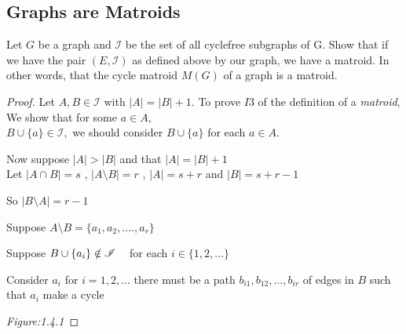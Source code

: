 \documentclass[../main.tex]{subfiles}
\begin{document}
\subsection{Graphs are Matroids} 
\begin{thm}
\noindent Let $G$ be a graph and $\mathcal{I}$ be the set of all cyclefree subgraphs of G.
Show that if we have the pair $(E,\mathcal{I})$ as defined above by our graph, we have a matroid. In other words, that the cycle matroid $M(G)$ of a graph is a matroid.
\end{thm} 
\begin{proof}
 Let $A,B \in \mathcal{I}$ with $|A|=|B|+1.$
 \noindent To prove $ I3 $ of the definition of a \textit{matroid}, We show that for some $a \in A ,$\\$ B \cup \{a\} \in \mathcal{I},$  we should consider $B \cup \{a\}$ for each $a \in A.$ 
 
 \noindent Now suppose $ |A|  >  |B| $ and that $|A|  =  |B| + 1$\\
 Let 
 $ |A \cap B| = s $ , $ |A \setminus B| = r$ ,
 $ |A| = s + r $ and $ |B| = s + r - 1$ 
 
\noindent So $ |B \setminus A| = r - 1$
 
 \noindent Suppose $ A \setminus B = \{ a_1, a_2, .... , a_r \} $ 
 
 \noindent Suppose $ B \cup \{ a_i \} \notin \mathcal{I} \hspace{3mm} $ for each $ i \in \{ 1,2,... \}$
 
 \noindent Consider $ a_i $ for $ i = 1, 2,... $ there must be a path $ b_{i1}, b_{12}, ... , b_{ir} $ of edges in $B$ such that $ a_i $ make a cycle
  
 \begin{minipage}{.2\textwidth}
\textit{Figure:1.4.1}
 \end{minipage}
\hspace{4cm} \begin{minipage}{.2\textwidth}
\end{minipage}
\end{proof}
\end{document}
